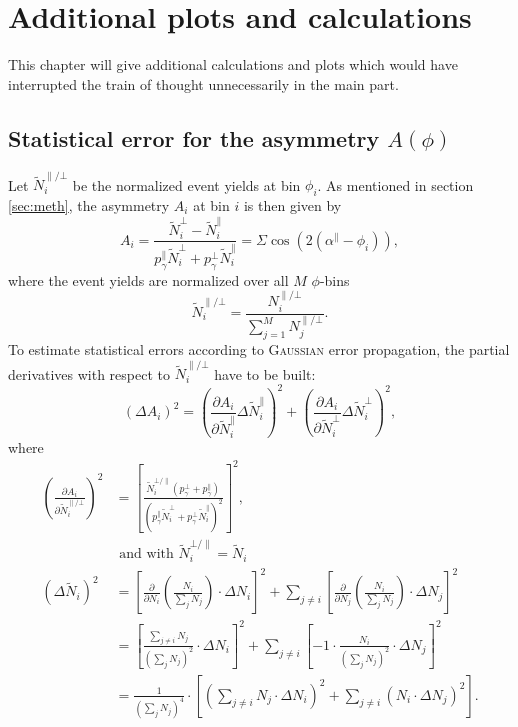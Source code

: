 \chapter{Additional plots and calculations}
\label{sec:app}
This chapter will give additional calculations and plots which would have interrupted the train of thought unnecessarily in the main part. 
\section{Statistical error for the asymmetry $A(\phi)$}
\allowdisplaybreaks
\label{sec:stat_err}
Let $\tilde{N}^{\parallel/\bot}_i$ be the normalized event yields at bin $\phi_i$. As mentioned in section \ref{sec:meth}, the asymmetry $A_i$ at bin $i$ is then given by
\begin{equation}
	A_i=\frac{\tilde{N}^\bot_i-\tilde{N}^\parallel_i}{p_\gamma^\parallel\tilde{N}^\bot_i+p_\gamma^\bot\tilde{N}^\parallel_i}=\Sigma\cos\left(2\left(\alpha^\parallel-\phi_i\right)\right),
	\label{eq:evyieldasym_app}
\end{equation}
where the event yields are normalized over all $M$ $\phi$-bins $$\tilde{N}^{\parallel/\bot}_i=\frac{N_i^{\parallel/\bot}}{\sum_{j=1}^{M}N_j^{\parallel/\bot}}.$$
 To estimate statistical errors according to \textsc{Gaussian} error propagation, the partial derivatives with respect to $\tilde{N}_i^{\parallel/\bot}$ have to be built:
 \begin{equation}
 	\left(\Delta A_i\right)^2=\left(\frac{\partial A_i}{\partial \tilde{N}^\parallel_i}\Delta \tilde{N}^\parallel_i\right)^2+\left(\frac{\partial A_i}{\partial \tilde{N}^\bot_i}\Delta \tilde{N}^\bot_i\right)^2,
 \end{equation}
where
\begin{align}
	\left(\frac{\partial A_i}{\partial \tilde{N}^{\parallel/\bot}_i}\right)^2&=\left[\frac{\tilde{N}^{\bot/\parallel}_i\left(p_\gamma^\bot+p_\gamma^\parallel\right)}{\left(p_\gamma^\parallel\tilde{N}^{\bot}_i+p_\gamma^\bot\tilde{N}^\parallel_i\right)^2}\right]^2,\\
	&\text{ and with } \tilde{N}_i^{\bot/\parallel}=\tilde{N}_i\\
	\left(\Delta\tilde{N}_i\right)^2&=\left[\frac{\partial}{\partial N_i}\left(\frac{N_i}{\sum_{j}N_j}\right)\cdot\Delta N_i\right]^2+\sum_{j\neq i}\left[\frac{\partial}{\partial N_j}\left(\frac{N_i}{\sum_{j}N_j}\right)\cdot\Delta N_j\right]^2\\
	&=\left[\frac{\sum_{j\neq i} N_j}{\left(\sum_{j} N_j\right)^2}\cdot\Delta N_i\right]^2+\sum_{j\neq i}\left[-1\cdot\frac{N_i}{\left(\sum_{j}N_j\right)^2}\cdot\Delta N_j\right]^2\\
	&=\frac{1}{\left(\sum_{j} N_j\right)^4}\cdot\left[\left(\sum_{j\neq i} N_j \cdot\Delta N_i\right)^2+\sum_{j\neq i}\left(N_i\cdot\Delta N_j\right)^2\right].
\end{align}
